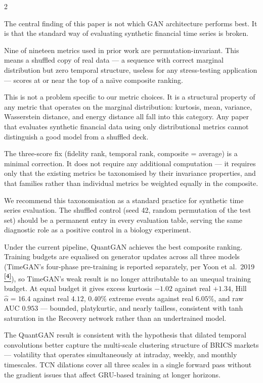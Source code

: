 \documentclass[10pt]{article}
\newcommand{\navybox}[2]{\begin{tcolorbox}[mybox={Navy}{LBg},title={#1}]#2\end{tcolorbox}}
\newcommand{\skybox}[2]{\begin{tcolorbox}[mybox={Sky}{BBg},title={#1}]#2\end{tcolorbox}}
\newcommand{\tcite}[1]{%
  \hyperlink{R:#1}{\textsuperscript{\scriptsize\textbf{[#1]}}}}
\begin{document}
\begin{multicols}{2}

\navybox{The Shuffled-Control Audit as a Methodological Contribution}{%
The central finding of this paper is not which GAN architecture performs best. It is that the standard way of evaluating synthetic financial time series is broken.

Nine of nineteen metrics used in prior work are permutation-invariant. This means a shuffled copy of real data --- a sequence with correct marginal distribution but zero temporal structure, useless for any stress-testing application --- scores at or near the top of a na\"{\i}ve composite ranking.

This is not a problem specific to our metric choices. It is a structural property of any metric that operates on the marginal distribution: kurtosis, mean, variance, Wasserstein distance, and energy distance all fall into this category. Any paper that evaluates synthetic financial data using only distributional metrics cannot distinguish a good model from a shuffled deck.

The three-score fix (fidelity rank, temporal rank, composite = average) is a minimal correction. It does not require any additional computation --- it requires only that the existing metrics be taxonomised by their invariance properties, and that families rather than individual metrics be weighted equally in the composite.

We recommend this taxonomisation as a standard practice for synthetic time series evaluation. The shuffled control (seed 42, random permutation of the test set) should be a permanent entry in every evaluation table, serving the same diagnostic role as a positive control in a biology experiment.}

\skybox{Architecture Comparison and the TimeGAN Result}{%
Under the current pipeline, QuantGAN achieves the best composite ranking. Training budgets are equalised on generator updates across all three models (TimeGAN's four-phase pre-training is reported separately, per Yoon et al.\ 2019\tcite{4}), so TimeGAN's weak result is no longer attributable to an unequal training budget. At equal budget it gives excess kurtosis $-1.02$ against real $+1.34$, Hill $\hat\alpha=16.4$ against real $4.12$, $0.40\%$ extreme events against real $6.05\%$, and raw AUC $0.953$ --- bounded, platykurtic, and nearly tailless, consistent with tanh saturation in the Recovery network rather than an undertrained model.

The QuantGAN result is consistent with the hypothesis that dilated temporal convolutions better capture the multi-scale clustering structure of BRICS markets --- volatility that operates simultaneously at intraday, weekly, and monthly timescales. TCN dilations cover all three scales in a single forward pass without the gradient issues that affect GRU-based training at longer horizons.

}
\end{multicols}
\end{document}
